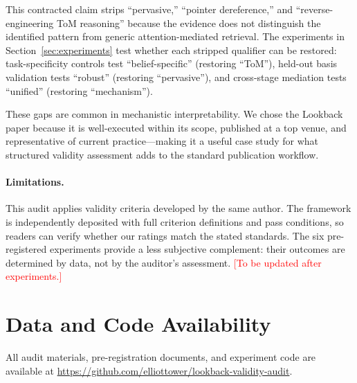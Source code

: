 \documentclass[11pt]{article}
\begin{document}
This contracted claim strips ``pervasive,'' ``pointer dereference,'' and ``reverse-engineering ToM reasoning'' because the evidence does not distinguish the identified pattern from generic attention-mediated retrieval. The experiments in Section~\ref{sec:experiments} test whether each stripped qualifier can be restored: task-specificity controls test ``belief-specific'' (restoring ``ToM''), held-out basis validation tests ``robust'' (restoring ``pervasive''), and cross-stage mediation tests ``unified'' (restoring ``mechanism'').

These gaps are common in mechanistic interpretability. We chose the Lookback paper because it is well-executed within its scope, published at a top venue, and representative of current practice---making it a useful case study for what structured validity assessment adds to the standard publication workflow.

\paragraph{Limitations.}
This audit applies validity criteria developed by the same author. The framework is independently deposited with full criterion definitions and pass conditions, so readers can verify whether our ratings match the stated standards. The six pre-registered experiments provide a less subjective complement: their outcomes are determined by data, not by the auditor's assessment. \textcolor{red}{[To be updated after experiments.]}


\section*{Data and Code Availability}

All audit materials, pre-registration documents, and experiment code are available at \url{https://github.com/elliottower/lookback-validity-audit}.




\end{document}
